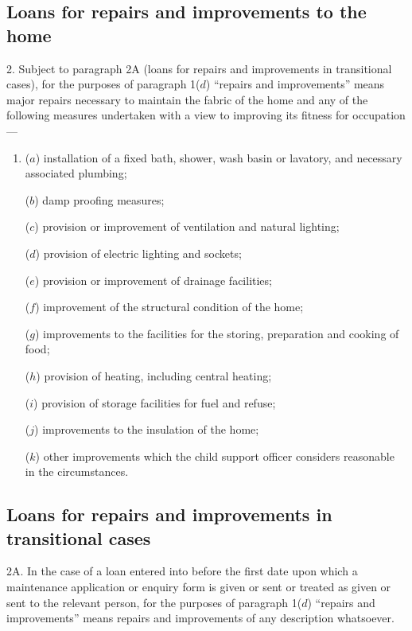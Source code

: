\documentclass[12pt,a4paper]{article}
\begin{document}
\subsection*{Loans for repairs and improvements to the home}

2.  %
Subject to paragraph 2A (loans for repairs and improvements in transitional cases), for the purposes of  %
paragraph 1($d$) “repairs and improvements” means major repairs necessary to maintain the fabric of the home and any of the following measures undertaken with a view to improving its fitness for occupation—
\begin{enumerate}\item[]
($a$) installation of a fixed bath, shower, wash basin or lavatory, and necessary associated plumbing;

($b$) damp proofing measures;

($c$) provision or improvement of ventilation and natural lighting;

($d$) provision of electric lighting and sockets;

($e$) provision or improvement of drainage facilities;

($f$) improvement of the structural condition of the home;

($g$) improvements to the facilities for the storing, preparation and cooking of food;

($h$) provision of heating, including central heating;

($i$) provision of storage facilities for fuel and refuse;

($j$) improvements to the insulation of the home;

($k$) other improvements which the child support officer considers reasonable in the circumstances.
\end{enumerate}


\subsection*{Loans for repairs and improvements in transitional cases}

2A.  In the case of a loan entered into before the first date upon which a maintenance application or enquiry form is given or sent or treated as given or sent to the relevant person, for the purposes of paragraph 1($d$) “repairs and improvements” means repairs and improvements of any description whatsoever.
\end{document}
